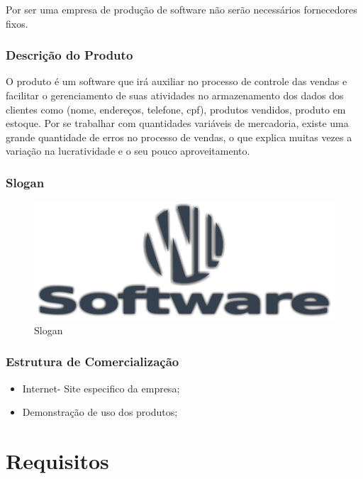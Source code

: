\documentclass[chapter=TITLE,12pt,oneside,a4paper,english,french,sumario=tradicional,spanish,brazil,]{abntex2}
\begin{document}
Por ser uma empresa de produção de software não serão necessários fornecedores fixos.

\subsection{Descrição do Produto}
O produto é um software que irá auxiliar no processo de controle das vendas e facilitar o gerenciamento de suas atividades no armazenamento dos dados dos clientes como (nome, endereços, telefone, cpf), produtos vendidos, produto em estoque. Por se trabalhar com quantidades variáveis de mercadoria, existe uma grande quantidade de erros no processo de vendas, o que explica muitas vezes a variação na lucratividade e o seu pouco aproveitamento.

\subsection{Slogan}
\begin{figure}[!htpb]\centering
	\includegraphics[scale=0.8]{logo.pdf}\caption{Slogan}
\end{figure}


\subsection{Estrutura de Comercialização}
\begin{itemize}
\item Internet- Site especifico da empresa;
\item Demonstração de uso dos produtos;
\end{itemize}


\chapter{Requisitos}
\end{document}
